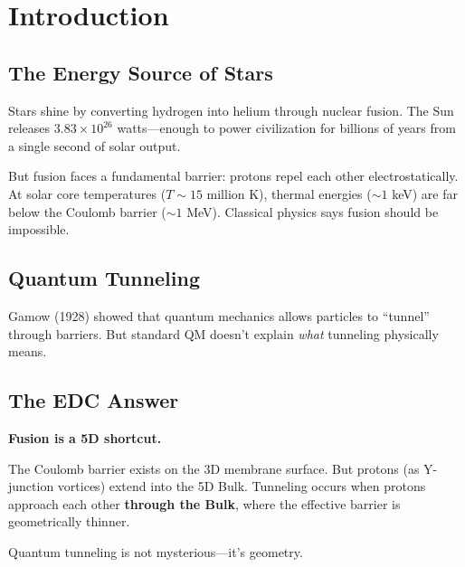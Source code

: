 \documentclass[12pt,a4paper]{article}
\begin{document}
\vspace{1em}

\tableofcontents
\newpage


\section{Introduction}

\subsection{The Energy Source of Stars}

Stars shine by converting hydrogen into helium through nuclear fusion. The Sun releases $3.83 \times 10^{26}$ watts---enough to power civilization for billions of years from a single second of solar output.

But fusion faces a fundamental barrier: protons repel each other electrostatically. At solar core temperatures ($T \sim 15$ million K), thermal energies ($\sim 1$ keV) are far below the Coulomb barrier ($\sim 1$ MeV). Classical physics says fusion should be impossible.

\subsection{Quantum Tunneling}

Gamow (1928) showed that quantum mechanics allows particles to ``tunnel'' through barriers. But standard QM doesn't explain \textit{what} tunneling physically means.

\subsection{The EDC Answer}

\begin{edcprinciple}
\textbf{Fusion is a 5D shortcut.}

The Coulomb barrier exists on the 3D membrane surface. But protons (as Y-junction vortices) extend into the 5D Bulk. Tunneling occurs when protons approach each other \textbf{through the Bulk}, where the effective barrier is geometrically thinner.

Quantum tunneling is not mysterious---it's geometry.
\end{edcprinciple}
\end{document}
